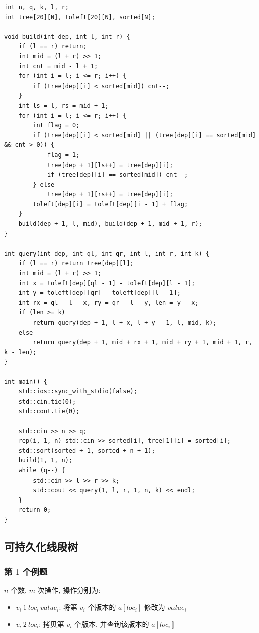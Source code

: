 \documentclass[UTF8, a4paper, titlepage, twoside]{ctexart}
\begin{document}
\begin{lstlisting}[style=cpp]
int n, q, k, l, r;
int tree[20][N], toleft[20][N], sorted[N];

void build(int dep, int l, int r) {
    if (l == r) return;
    int mid = (l + r) >> 1;
    int cnt = mid - l + 1;
    for (int i = l; i <= r; i++) {
        if (tree[dep][i] < sorted[mid]) cnt--;
    }
    int ls = l, rs = mid + 1;
    for (int i = l; i <= r; i++) {
        int flag = 0;
        if (tree[dep][i] < sorted[mid] || (tree[dep][i] == sorted[mid] && cnt > 0)) {
            flag = 1;
            tree[dep + 1][ls++] = tree[dep][i];
            if (tree[dep][i] == sorted[mid]) cnt--;
        } else
            tree[dep + 1][rs++] = tree[dep][i];
        toleft[dep][i] = toleft[dep][i - 1] + flag;
    }
    build(dep + 1, l, mid), build(dep + 1, mid + 1, r);
}

int query(int dep, int ql, int qr, int l, int r, int k) {
    if (l == r) return tree[dep][l];
    int mid = (l + r) >> 1;
    int x = toleft[dep][ql - 1] - toleft[dep][l - 1];
    int y = toleft[dep][qr] - toleft[dep][l - 1];
    int rx = ql - l - x, ry = qr - l - y, len = y - x;
    if (len >= k)
        return query(dep + 1, l + x, l + y - 1, l, mid, k);
    else
        return query(dep + 1, mid + rx + 1, mid + ry + 1, mid + 1, r, k - len);
}

int main() {
    std::ios::sync_with_stdio(false);
    std::cin.tie(0);
    std::cout.tie(0);

    std::cin >> n >> q;
    rep(i, 1, n) std::cin >> sorted[i], tree[1][i] = sorted[i];
    std::sort(sorted + 1, sorted + n + 1);
    build(1, 1, n);
    while (q--) {
        std::cin >> l >> r >> k;
        std::cout << query(1, l, r, 1, n, k) << endl;
    }
    return 0;
}
\end{lstlisting}

\subsection{ 可持久化线段树 }
\subsubsection{ 第 $1$ 个例题 }
$n$ 个数, $m$ 次操作, 操作分别为:
\begin{itemize}
    \item $v_i \ 1 \ loc_i \ value_i$: 将第 $v_i$ 个版本的 $a[loc_i]$ 修改为 $value_i$
    \item $v_i \ 2 \ loc_i$: 拷贝第 $v_i$ 个版本, 并查询该版本的 $a[loc_i]$
\end{itemize}
\end{document}
